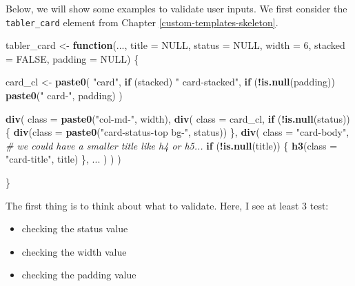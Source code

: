 \documentclass[
]{book}
\newenvironment{Shaded}{\begin{snugshade}}{\end{snugshade}}
\newcommand{\CommentTok}[1]{\textcolor[rgb]{0.56,0.35,0.01}{\textit{#1}}}
\newcommand{\ControlFlowTok}[1]{\textcolor[rgb]{0.13,0.29,0.53}{\textbf{#1}}}
\newcommand{\DataTypeTok}[1]{\textcolor[rgb]{0.13,0.29,0.53}{#1}}
\newcommand{\DecValTok}[1]{\textcolor[rgb]{0.00,0.00,0.81}{#1}}
\newcommand{\KeywordTok}[1]{\textcolor[rgb]{0.13,0.29,0.53}{\textbf{#1}}}
\newcommand{\NormalTok}[1]{#1}
\newcommand{\OperatorTok}[1]{\textcolor[rgb]{0.81,0.36,0.00}{\textbf{#1}}}
\newcommand{\OtherTok}[1]{\textcolor[rgb]{0.56,0.35,0.01}{#1}}
\newcommand{\StringTok}[1]{\textcolor[rgb]{0.31,0.60,0.02}{#1}}
\providecommand{\tightlist}{%
  \setlength{\itemsep}{0pt}\setlength{\parskip}{0pt}}
\begin{document}
Below, we will show some examples to validate user inputs. We first consider the \texttt{tabler\_card} element from Chapter \ref{custom-templates-skeleton}.

\begin{Shaded}
\begin{Highlighting}[]
\NormalTok{tabler_card <-}\StringTok{ }\ControlFlowTok{function}\NormalTok{(..., }\DataTypeTok{title =} \OtherTok{NULL}\NormalTok{, }\DataTypeTok{status =} \OtherTok{NULL}\NormalTok{, }\DataTypeTok{width =} \DecValTok{6}\NormalTok{, }\DataTypeTok{stacked =} \OtherTok{FALSE}\NormalTok{, }\DataTypeTok{padding =} \OtherTok{NULL}\NormalTok{) \{}
  
\NormalTok{  card_cl <-}\StringTok{ }\KeywordTok{paste0}\NormalTok{(}
    \StringTok{"card"}\NormalTok{, }
    \ControlFlowTok{if}\NormalTok{ (stacked) }\StringTok{" card-stacked"}\NormalTok{,}
    \ControlFlowTok{if}\NormalTok{ (}\OperatorTok{!}\KeywordTok{is.null}\NormalTok{(padding)) }\KeywordTok{paste0}\NormalTok{(}\StringTok{" card-"}\NormalTok{, padding)}
\NormalTok{  )}
  
  \KeywordTok{div}\NormalTok{(}
    \DataTypeTok{class =} \KeywordTok{paste0}\NormalTok{(}\StringTok{"col-md-"}\NormalTok{, width),}
    \KeywordTok{div}\NormalTok{(}
      \DataTypeTok{class =}\NormalTok{ card_cl,}
      \ControlFlowTok{if}\NormalTok{ (}\OperatorTok{!}\KeywordTok{is.null}\NormalTok{(status)) \{}
        \KeywordTok{div}\NormalTok{(}\DataTypeTok{class =} \KeywordTok{paste0}\NormalTok{(}\StringTok{"card-status-top bg-"}\NormalTok{, status))}
\NormalTok{      \},}
      \KeywordTok{div}\NormalTok{(}
        \DataTypeTok{class =} \StringTok{"card-body"}\NormalTok{,}
        \CommentTok{# we could have a smaller title like h4 or h5...}
        \ControlFlowTok{if}\NormalTok{ (}\OperatorTok{!}\KeywordTok{is.null}\NormalTok{(title)) \{}
          \KeywordTok{h3}\NormalTok{(}\DataTypeTok{class =} \StringTok{"card-title"}\NormalTok{, title)}
\NormalTok{        \},}
\NormalTok{        ...}
\NormalTok{      )}
\NormalTok{    )}
\NormalTok{  )}
  
\NormalTok{\}}
\end{Highlighting}
\end{Shaded}

The first thing is to think about what to validate. Here, I see at least 3 test:

\begin{itemize}
\tightlist
\item
  checking the status value
\item
  checking the width value
\item
  checking the padding value
\end{itemize}
\end{document}
